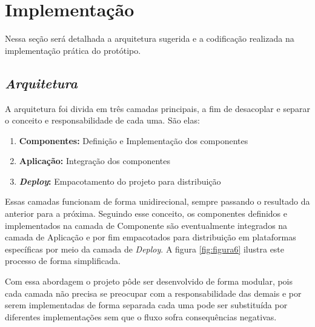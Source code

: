 
\section{\esp Implementação}

Nessa seção será detalhada a arquitetura sugerida e a codificação realizada na implementação prática do protótipo.

\subsection{{\it Arquitetura}}

A arquitetura foi divida em três camadas principais, a fim de desacoplar e separar o conceito e responsabilidade de cada uma. São elas:

\begin{enumerate}
	\item \textbf{Componentes:} Definição e Implementação dos componentes
	\item \textbf{Aplicação:} Integração dos componentes 
	\item \textbf{\textit{Deploy}:} Empacotamento do projeto para distribuição
\end{enumerate}

Essas camadas funcionam de forma unidirecional, sempre passando o resultado da anterior para a próxima. Seguindo esse conceito, os componentes definidos e implementados na camada de Componente são eventualmente integrados na camada de Aplicação e por fim empacotados para distribuição em plataformas específicas por meio da camada de \textit{Deploy}. A figura \ref{fig:figura6} ilustra este processo de forma simplificada.

Com essa abordagem o projeto pôde ser desenvolvido de forma modular, pois cada camada não precisa se preocupar com a responsabilidade das demais e por serem implementadas de forma separada cada uma pode ser substituída por diferentes implementações sem que o fluxo sofra consequências negativas.

